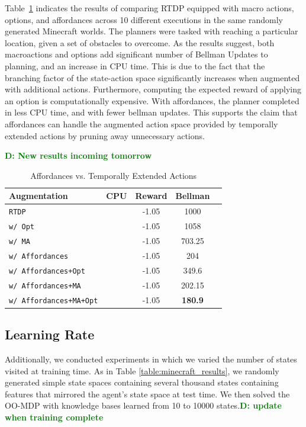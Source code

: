 \documentclass[conference]{IEEEtran}
\newcommand{\dnote}[1]{\textcolor{Green}{\textbf{D: #1}}}
\begin{document}
Table~\ref{table:temp_ext_act_results} indicates the results of comparing RTDP
equipped with macro actions, options, and affordances across 10 different executions
in the same randomly generated Minecraft worlds. The planners were tasked with 
reaching a particular location, given a set of obstacles to overcome. As the results 
suggest, both macroactions and options add significant number of Bellman Updates to 
planning, and an increase in CPU time. This is due to the fact that the branching factor of the state-action space significantly increases when augmented with additional actions. Furthermore, computing the expected reward of applying an option is computationally expensive. With affordances, the planner completed in less CPU time, and with fewer 
bellman updates. This supports the claim that affordances can handle the augmented 
action space provided by temporally extended actions by pruning away unnecessary actions.

\dnote{New results incoming tomorrow}
\begin{table}[H]
\centering
\caption{Affordances vs. Temporally Extended Actions}
\begin{tabular}{ l  || c c c c}
  Augmentation 						&	CPU	&	Reward 	& Bellman \\ \hline
  \texttt{RTDP}  						&		&	-1.05		&	1000		\\
  \texttt{w/ Opt}  					&		&	-1.05		&	1058		\\
  \texttt{w/ MA}  						&		&	-1.05		&	703.25		\\
  \texttt{w/ Affordances}  				& 		&	-1.05		&	204		\\
  \texttt{w/ Affordances+Opt}  			& 		&	-1.05		&	349.6		\\
   \texttt{w/ Affordances+MA}  			& 		&	-1.05		&	202.15		\\
   \texttt{w/ Affordances+MA+Opt}  		& 		&	-1.05		&	{\bf 180.9}		\\
\end{tabular}
\label{table:temp_ext_act_results}
\end{table}

\subsection{Learning Rate}
Additionally, we conducted experiments in which we varied the number of states visited at training time. 
As in Table \ref{table:minecraft_results}, we randomly generated simple state spaces
containing several thousand states containing features that mirrored the agent's state
space at test time. We then solved the OO-MDP with knowledge bases learned from 
10 to 10000 states.\dnote{update when training complete}
\end{document}
